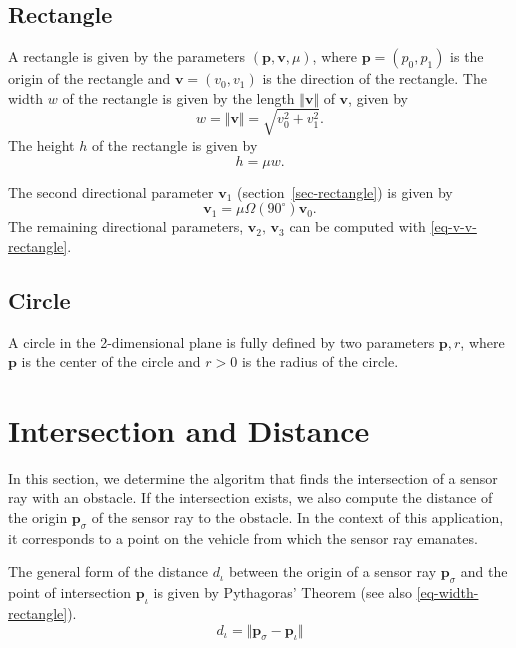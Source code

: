 \documentclass[11pt]{article}
\newcommand{\diota}{d_\iota}
\newcommand{\pb}{\mathbf{p}}
\newcommand{\pbiot}{\mathbf{p}_\iota}
\newcommand{\pbsig}{\mathbf{p}_\sigma}
\newcommand{\vb}{\mathbf{v}}
\begin{document}
\subsection{Rectangle}
\label{sec-representation-rectangle}

A rectangle is given by the parameters $(\pb, \vb, \mu)$, where 
$\pb=(p_{0}, p_{1})$ is the origin of the rectangle and $\vb=(v_{0}, v_{1})$ is
the direction of the rectangle. The width $w$ of the rectangle is given by
the length $\Vert\vb\Vert$ of $\vb$, given by
\begin{equation}
    w = \Vert\vb\Vert = \sqrt{v_{0}^2 + v_{1}^2}.\label{eq-width-rectangle}
\end{equation}
The height $h$ of the rectangle is given by
\begin{equation}
    h = \mu w.\label{eq-height-rectangle}
\end{equation}

The second directional parameter $\vb_1$ (section~\ref{sec-rectangle}) is given
by
\begin{equation}
    \vb_1 = \mu\Omega(90^\circ)\vb_0.\label{eq-vb1-rectangle}
\end{equation}
The remaining directional parameters, $\vb_2,\,\vb_3$ can be computed with
\eqref{eq-v-v-rectangle}.   

\subsection{Circle}

A circle in the 2-dimensional plane is fully defined by two parameters
$\pb, r$, where $\pb$ is the center of the circle and $r>0$ is the
radius of the circle.


\section{Intersection and Distance}
\label{sec-intersection-distance}

In this section, we determine the algoritm that finds the intersection of a
sensor ray  with an obstacle. If the intersection
exists, we also compute the distance of the origin $\pbsig$ of the
sensor ray to the obstacle. In the context of this application, it 
corresponds to a point on the vehicle from which the sensor ray emanates.

The general form of the distance $\diota$ between the origin of a sensor ray
$\pbsig$ and the point of intersection $\pbiot$ is given by
Pythagoras' Theorem (see also \eqref{eq-width-rectangle}).
\begin{equation}
    \diota = \Vert\pbsig-\pbiot\Vert
\end{equation}
\end{document}
